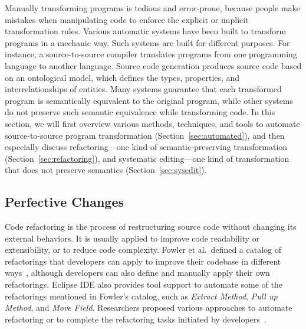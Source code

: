\documentclass[runningheads,a4paper]{llncs}
\begin{document}


Manually transforming programs is tedious and error-prone, because people make mistakes when manipulating code to enforce the explicit or implicit transformation rules.
Various automatic systems have been built to transform programs in a mechanic way. Such systems are built for different purposes. For instance, a source-to-source compiler translates programs from one programming language to another language. Source code generation produces source code based on an ontological model, which defines the types, properties, and interrelationships of entities. 
Many systems guarantee that each transformed program is semantically equivalent to the original program, while other systems do not preserve such semantic equivalence while transforming code. In this section, we will first overview various methods, techniques, and tools to automate source-to-source program transformation (Section~\ref{sec:automated}), and then especially discuss refactoring---one kind of semantic-preserving transformation (Section~\ref{sec:refactoring}), and systematic editing---one kind of transformation that does not preserve semantics (Section~\ref{sec:sysedit}).

\subsection{Perfective Changes} 

Code refactoring is the process of restructuring source code without changing its external behaviors. It is usually applied to improve code readability or extensibility, or to reduce code complexity. 
Fowler et al.~defined a catalog of refactorings that developers can apply to improve their codebase in different ways~\cite{1999:RID}, although developers can also define and manually apply their own refactorings. Eclipse IDE also provides tool support to automate some of the refactorings mentioned in Fowler's catalog, such as \emph{Extract Method}, \emph{Pull up Method}, and \emph{Move Field}. Researchers proposed various approaches to automate refactoring or to complete the refactoring tasks initiated by developers~\cite{Griswold:1992,Balazinska1999,Dig:2009,Ge:2012,Chen:2013,Lee:2013,Tsantalis2013:icsm,Meng:2015,Kim:2016}.
\end{document}
